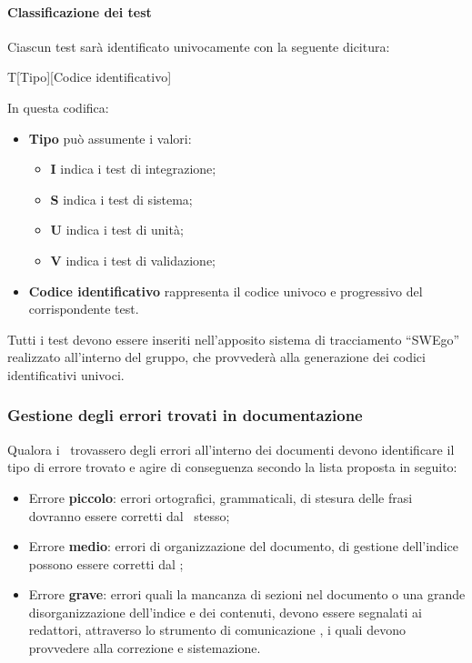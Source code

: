 \documentclass[../NormeDiProgetto.tex]{subfiles}
\begin{document}
					\paragraph{Classificazione dei test\\}
					Ciascun test sarà identificato univocamente con la seguente dicitura:
					\begin{center}
						T[Tipo][Codice identificativo]
					\end{center}
					In questa codifica:
					\begin{itemize}
						\item \textbf{Tipo} può assumente i valori:
						\begin{itemize}
							\item \textbf{I} indica i test di integrazione;
							\item \textbf{S} indica i test di sistema;
							\item \textbf{U} indica i test di unità;
							\item \textbf{V} indica i test di validazione;
						\end{itemize}
						\item \textbf{Codice identificativo} rappresenta il codice univoco e progressivo del
						corrispondente test.
					\end{itemize}
					Tutti i test devono essere inseriti nell'apposito sistema di tracciamento ``SWEgo''
					realizzato all'interno del gruppo, che provvederà alla generazione
					dei codici identificativi univoci.
				
				\subsubsection{Gestione degli errori trovati in documentazione\\}
					Qualora i \verificatori\ trovassero degli errori all'interno dei documenti devono
					identificare il tipo di errore trovato e agire di conseguenza
					secondo la lista proposta in seguito:
					\begin{itemize}
						\item Errore \textbf{piccolo}: errori ortografici, grammaticali, di stesura delle
						frasi dovranno essere corretti dal \verificatore\ stesso;
						\item Errore \textbf{medio}: errori di organizzazione del documento, di gestione
						dell'indice possono essere corretti dal \verificatore;
						\item Errore \textbf{grave}: errori quali la mancanza di sezioni nel documento o una
						grande disorganizzazione dell'indice e dei contenuti, devono essere segnalati ai
						redattori, attraverso lo strumento di comunicazione , i quali devono
						provvedere alla correzione e sistemazione.
					\end{itemize}
\end{document}

